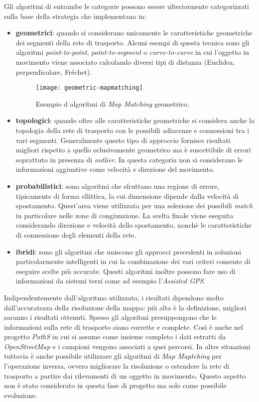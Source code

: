 Gli algoritmi di entrambe le categorie possono essere ulteriormente categorizzati sulla base della strategia che implementano in:
\begin{itemize}
\item \textbf{geometrici}: quando si considerano unicamente le caratteristiche geometriche dei segmenti della rete di trasporto. Alcuni esempi di questa tecnica sono gli algoritmi \emph{point-to-point}, \emph{point-to-segment} o \emph{curve-to-curve} in cui l'oggetto in movimento viene associato calcolando diversi tipi di distanza (Euclidea, perpendicolare, Fréchet).
\begin{figure}[h]
  \centering
  \texttt{[image: geometric-mapmatching]}
  \caption{\footnotesize{Esempio d algoritmi di \emph{Map Matching} geometrico.}}
  \label{fig:geometric-mapmatching}
\end{figure}
\item \textbf{topologici}: quando oltre alle caratteristiche geometriche si considera anche la topologia della rete di trasporto con le possibili adiacenze e connessioni tra i vari segmenti. Generalmente questo tipo di approccio fornisce risultati migliori rispetto a quello eclusivamente geometrico ma è suscettibile di errori soprattuto in presenza di \emph{outlier}. In questa categoria non si considerano le informazioni aggiuntive come velocità e direzione del movimento. 
\item \textbf{probabilistici}: sono algoritmi che sfruttano una regione di errore, tipicamente di forma ellittica, la cui dimensione dipende dalla velocità di spostamento. Quest'area viene utilizzata per una selezione dei possibili \emph{match} in particolare nelle zone di congiunzione. La scelta finale viene eseguita considerando direzione e velocità dello spostamento, nonchè le caratteristiche di connessione degli elementi della rete.
\item \textbf{ibridi}: sono gli algoritmi che uniscono gli approcci precedenti in soluzioni particolarmente intelligenti in cui la combinazione dei vari criteri consente di eseguire scelte più accurate. Questi algoritmi inoltre possono fare uso di informazioni da sistemi terzi come ad esempio l'\emph{Assisted GPS}.
\end{itemize}

Indipendentemente dall'algoritmo utilizzato, i risultati dipendono molto dall'accuratezza della risoluzione della mappa: più alta è la definizione, migliori saranno i risultati ottenuti. Spesso gli algoritmi presuppongono che le informazioni sulla rete di trasporto siano corrette e complete. Così è anche nel progetto \emph{PathS} in cui si assume come insieme completo i dati estratti da \emph{OpenStreetMap} e i campioni vengono associati a quei percorsi. In altre situazioni tuttavia è anche possibile utilizzare gli algoritmi di \emph{Map Maptching} per l'operazione inversa, ovvero migliorare la risoluzione o estendere la rete di trasporto a partire dai rilevamenti di un oggetto in movimento. Questo aspetto non è stato considerato in questa fase di progetto ma solo come possibile evoluzione.

